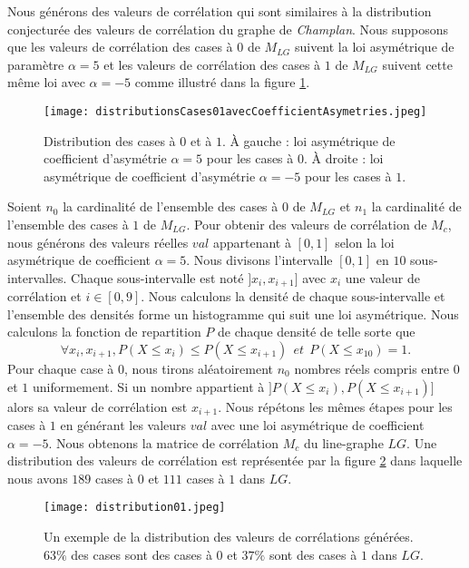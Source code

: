 Nous  g\'en\'erons des valeurs de corr\'elation qui sont similaires \`a la distribution conjectur\'ee des valeurs de corr\'elation  du graphe de {\em Champlan}. Nous supposons que les valeurs de corr\'elation des cases \`a $0$ de $M_{LG}$ suivent la loi asym\'etrique de param\`etre $\alpha = 5$ et les valeurs de corr\'elation  des cases \`a $1$ de $M_{LG}$ suivent  cette m\^eme loi avec $\alpha = -5$ comme illustr\'e dans la figure \ref{distributionsCases01avecCoefficientAsymetries}. 
\begin{figure}[htb!] 
\centering
\texttt{[image: distributionsCases01avecCoefficientAsymetries.jpeg]}
\caption{ Distribution des cases \`a $0$ et \`a $1$. \`A gauche : loi asym\'etrique de coefficient d'asym\'etrie $\alpha = 5$ pour les cases \`a $0$.  \`A droite : loi asym\'etrique de coefficient d'asym\'etrie $\alpha = -5$ pour les cases \`a $1$.}
\label{distributionsCases01avecCoefficientAsymetries} 
\end{figure}
\newline

Soient 
$n_0$ la cardinalit\'e de l'ensemble des cases \`a $0$  de $M_{LG}$ et $n_1$ la cardinalit\'e de l'ensemble des cases \`a $1$ de $M_{LG}$.
Pour obtenir des valeurs de corr\'elation de $M_c$, nous g\'en\'erons  des valeurs r\'eelles $val$ appartenant \`a $[0,1]$ selon la loi asym\'etrique de coefficient $\alpha = 5$. Nous divisons l'intervalle $ [0,1]$ en $10$ sous-intervalles. Chaque sous-intervalle est not\'e  $]x_i,x_{i+1}]$ avec $x_i$ une valeur de corr\'elation et $i \in [0, 9]$. Nous calculons la densit\'e de chaque sous-intervalle et l'ensemble des densit\'es forme un histogramme qui suit une loi asym\'etrique.
Nous calculons la fonction de repartition $P$ de chaque densit\'e de telle sorte que 
$$
\forall x_i, x_{i+1}, P(X \le x_i) \le P(X \le x_{i+1}) ~~ et ~~ P(X \le x_{10}) = 1.
$$
\newline
Pour chaque case \`a $0$, nous tirons al\'eatoirement $n_0$ nombres r\'eels compris entre $0$ et $1$ uniformement. Si un nombre appartient \`a $]P(X \le x_i), P(X \le x_{i+1}) ]$ alors sa valeur de corr\'elation est $x_{i+1}$. Nous r\'ep\'etons les m\^emes \'etapes pour les cases \`a $1$ en g\'en\'erant les valeurs $val$ avec une loi asym\'etrique de coefficient $\alpha = -5$.
Nous obtenons la matrice de corr\'elation $M_c$ du line-graphe $LG$. Une distribution des valeurs de corr\'elation est repr\'esent\'ee par la figure \ref{distribution01} dans laquelle nous avons $189$ cases \`a $0$ et $111$ cases \`a $1$ dans $LG$.
\begin{figure}[htb!] 
\centering
\texttt{[image: distribution01.jpeg]}
\caption{ Un exemple de la distribution des valeurs de corr\'elations g\'en\'er\'ees. $63\%$ des cases sont des cases \`a 0 et $37\%$ sont des cases \`a $1$ dans $LG$.}
\label{distribution01} 
\end{figure}

